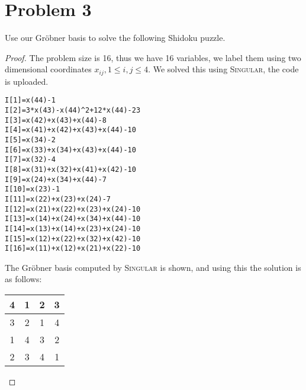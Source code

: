 \documentclass{article}[12pt]
\begin{document}
\section*{Problem 3} Use our Gr\"obner basis to solve the following
Shidoku puzzle.
\begin{proof}
The problem size is 16, thus we have 16 variables, 
we label them using two dimensional coordinates $x_{ij},1\le i,j \le 4$.
We solved this using \textsc{Singular}, the code is uploaded.
\begin{verbatim}
I[1]=x(44)-1
I[2]=3*x(43)-x(44)^2+12*x(44)-23
I[3]=x(42)+x(43)+x(44)-8
I[4]=x(41)+x(42)+x(43)+x(44)-10
I[5]=x(34)-2
I[6]=x(33)+x(34)+x(43)+x(44)-10
I[7]=x(32)-4
I[8]=x(31)+x(32)+x(41)+x(42)-10
I[9]=x(24)+x(34)+x(44)-7
I[10]=x(23)-1
I[11]=x(22)+x(23)+x(24)-7
I[12]=x(21)+x(22)+x(23)+x(24)-10
I[13]=x(14)+x(24)+x(34)+x(44)-10
I[14]=x(13)+x(14)+x(23)+x(24)-10
I[15]=x(12)+x(22)+x(32)+x(42)-10
I[16]=x(11)+x(12)+x(21)+x(22)-10
\end{verbatim}
The Gr\"obner basis computed by \textsc{Singular} is shown, and using this
the solution is as follows:

\begin{centering}
\begin{tabular}{|c|c|c|c|}
\hline
4 & 1 & 2 & 3\\
\hline
3 & 2 & 1 & 4\\
\hline
1 & 4 & 3 & 2\\
\hline
2 & 3 & 4 & 1\\
\hline
\end{tabular}
\end{centering}
\end{proof}
\end{document}
